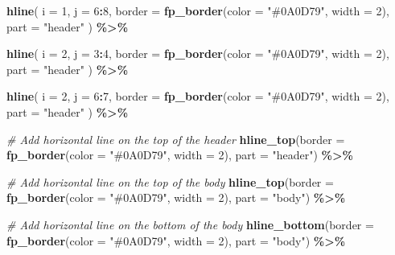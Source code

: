 \documentclass[
]{article}
\newenvironment{Shaded}{\begin{snugshade}}{\end{snugshade}}
\newcommand{\AttributeTok}[1]{\textcolor[rgb]{0.13,0.29,0.53}{#1}}
\newcommand{\CommentTok}[1]{\textcolor[rgb]{0.56,0.35,0.01}{\textit{#1}}}
\newcommand{\DecValTok}[1]{\textcolor[rgb]{0.00,0.00,0.81}{#1}}
\newcommand{\FunctionTok}[1]{\textcolor[rgb]{0.13,0.29,0.53}{\textbf{#1}}}
\newcommand{\NormalTok}[1]{#1}
\newcommand{\SpecialCharTok}[1]{\textcolor[rgb]{0.81,0.36,0.00}{\textbf{#1}}}
\newcommand{\StringTok}[1]{\textcolor[rgb]{0.31,0.60,0.02}{#1}}
\begin{document}
\begin{Shaded}
\begin{Highlighting}[]
  \FunctionTok{hline}\NormalTok{(}
    \AttributeTok{i =} \DecValTok{1}\NormalTok{, }
    \AttributeTok{j =} \DecValTok{6}\SpecialCharTok{:}\DecValTok{8}\NormalTok{, }
    \AttributeTok{border =} \FunctionTok{fp\_border}\NormalTok{(}\AttributeTok{color =} \StringTok{"\#0A0D79"}\NormalTok{, }\AttributeTok{width =} \DecValTok{2}\NormalTok{),}
    \AttributeTok{part =} \StringTok{"header"}
\NormalTok{  ) }\SpecialCharTok{\%\textgreater{}\%}
  
  \FunctionTok{hline}\NormalTok{(}
    \AttributeTok{i =} \DecValTok{2}\NormalTok{, }
    \AttributeTok{j =} \DecValTok{3}\SpecialCharTok{:}\DecValTok{4}\NormalTok{, }
    \AttributeTok{border =} \FunctionTok{fp\_border}\NormalTok{(}\AttributeTok{color =} \StringTok{"\#0A0D79"}\NormalTok{, }\AttributeTok{width =} \DecValTok{2}\NormalTok{),}
    \AttributeTok{part =} \StringTok{"header"}
\NormalTok{  ) }\SpecialCharTok{\%\textgreater{}\%}
  
  \FunctionTok{hline}\NormalTok{(}
    \AttributeTok{i =} \DecValTok{2}\NormalTok{, }
    \AttributeTok{j =} \DecValTok{6}\SpecialCharTok{:}\DecValTok{7}\NormalTok{, }
    \AttributeTok{border =} \FunctionTok{fp\_border}\NormalTok{(}\AttributeTok{color =} \StringTok{"\#0A0D79"}\NormalTok{, }\AttributeTok{width =} \DecValTok{2}\NormalTok{),}
    \AttributeTok{part =} \StringTok{"header"}
\NormalTok{  ) }\SpecialCharTok{\%\textgreater{}\%}
  
  \CommentTok{\# Add horizontal line on the top of the header}
  \FunctionTok{hline\_top}\NormalTok{(}\AttributeTok{border =} \FunctionTok{fp\_border}\NormalTok{(}\AttributeTok{color =} \StringTok{"\#0A0D79"}\NormalTok{, }\AttributeTok{width =} \DecValTok{2}\NormalTok{), }\AttributeTok{part =} \StringTok{"header"}\NormalTok{) }\SpecialCharTok{\%\textgreater{}\%}
  
  \CommentTok{\# Add horizontal line on the top of the body}
  \FunctionTok{hline\_top}\NormalTok{(}\AttributeTok{border =} \FunctionTok{fp\_border}\NormalTok{(}\AttributeTok{color =} \StringTok{"\#0A0D79"}\NormalTok{, }\AttributeTok{width =} \DecValTok{2}\NormalTok{), }\AttributeTok{part =} \StringTok{"body"}\NormalTok{) }\SpecialCharTok{\%\textgreater{}\%}
  
  \CommentTok{\# Add horizontal line on the bottom of the body}
  \FunctionTok{hline\_bottom}\NormalTok{(}\AttributeTok{border =} \FunctionTok{fp\_border}\NormalTok{(}\AttributeTok{color =} \StringTok{"\#0A0D79"}\NormalTok{, }\AttributeTok{width =} \DecValTok{2}\NormalTok{), }\AttributeTok{part =} \StringTok{"body"}\NormalTok{) }\SpecialCharTok{\%\textgreater{}\%}
  

\end{Highlighting}
\end{Shaded}
\end{document}
